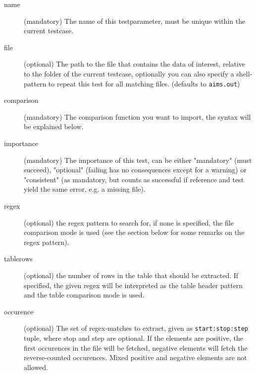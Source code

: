 \documentclass[a4paper,12pt]{scrartcl}
\begin{document}
\begin{description}
    \item[name] (mandatory) The name of this testparameter, must be unique within the current testcase.
    \item[file] (optional) The path to the file that contains the data of interest, relative to the folder of the
        current testcase, optionally you can also specify a shell-pattern to repeat this test for all matching files.
        (defaults to \texttt{aims.out})
    \item[comparison] (mandatory) The comparison function you want to import, the syntax will be explained below.
    \item[importance] (mandatory) The importance of this test, can be either "mandatory" (must succeed), "optional"
        (failing has no consequences except for a warning) or "consistent" (as mandatory, but counts as successful
        if reference and test yield the same error, e.g. a missing file).
    \item[regex] (optional) the regex pattern to search for, if none is specified, the file comparison mode is used
        (see the section below for some remarks on the regex pattern).
    \item[tablerows] (optional) the number of rows in the table that should be extracted. If specified, the given
        regex will be interpreted as the table header pattern and the table comparison mode is used.
    \item[occurence] (optional) The set of regex-matches to extract, given as \texttt{start:stop:step} tuple, where
        stop and step are optional. If the elements are positive, the first occurences in the file will be fetched,
        negative elements will fetch the reverse-counted occurences. Mixed positive and negative elements are not
        allowed.
\end{description}
\end{document}
